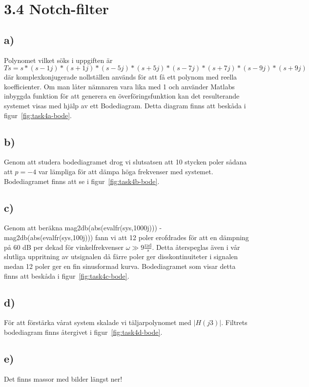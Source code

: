 \section*{3.4 Notch-filter}
\subsection*{a)}
Polynomet vilket söks i uppgiften är 
$Ts = s*(s-1j)*(s+1j)*(s-5j)*(s+5j)*(s-7j)*(s+7j)*(s-9j)*(s+9j)$ där
komplexkonjugerade nollställen används för att få ett polynom med reella
koefficienter. Om man låter nämnaren vara lika med 1 och använder Matlabs
inbyggda funktion för att generera en överföringsfunktion kan det resulterande
systemet visas med hjälp av ett Bodediagram. Detta diagram finns att beskåda i
figur~\ref{fig:task4a-bode}.

\subsection*{b)}
Genom att studera bodediagramet drog vi slutsatsen att 10 stycken poler sådana att
$p=-4$ var lämpliga för att dämpa höga frekvenser med systemet. Bodediagramet
finns att se i figur~\ref{fig:task4b-bode}.

\subsection*{c)}
Genom att beräkna mag2db(abs(evalfr(sys,1000j))) -
mag2db(abs(evalfr(sys,100j))) fann vi att 12 poler erofdrades för att en
dämpning på 60 dB per dekad för vinkelfrekvenser $\omega \gg 9 
\frac{\text{rad}}{s}$. Detta återspeglas även i vår slutliga uppritning av
utsignalen då färre poler ger disskontinuiteter i signalen medan 12 poler ger
en fin sinusformad kurva. Bodediagramet som visar detta finns att beskåda i
figur~\ref{fig:task4c-bode}.

\subsection*{d)}
För att förstärka vårat system skalade vi täljarpolynomet med $|H(j3)|$.
Filtrets bodediagram finns återgivet i figur~\ref{fig:task4d-bode}.

\subsection*{e)}
Det finns massor med bilder längst ner!
